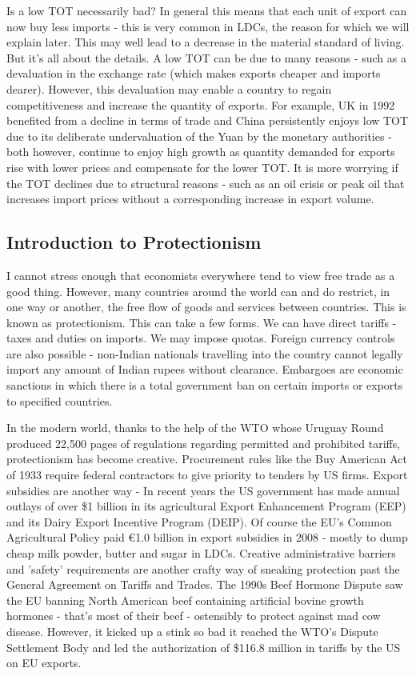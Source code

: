 Is a low TOT necessarily bad? In general this means that each unit of export can now buy less imports - this is very common in LDCs, the reason for which we will explain later. This may well lead to a decrease in the material standard of living. But it's all about the details. A low TOT can be due to many reasons - such as a devaluation in the exchange rate (which makes exports cheaper and imports dearer). However, this devaluation may enable a country to regain competitiveness and increase the quantity of exports. For example, UK in 1992 benefited from a decline in terms of trade and China persistently enjoys low TOT due to its deliberate undervaluation of the Yuan by the monetary authorities - both however, continue to enjoy high growth as quantity demanded for exports rise with lower prices and compensate for the lower TOT. It is more worrying if the TOT declines due to structural reasons - such as an oil crisis or peak oil that increases import prices without a corresponding increase in export volume.
\subsection{Introduction to Protectionism}
I cannot stress enough that economists everywhere tend to view free trade as a good thing. However, many countries around the world can and do restrict, in one way or another, the free flow of goods and services between countries. This is known as protectionism. This can take a few forms. We can have direct tariffs - taxes and duties on imports. We may impose quotas. Foreign currency controls are also possible - non-Indian nationals travelling into the country cannot legally import any amount of Indian rupees without clearance. Embargoes are economic sanctions in which there is a total government ban on certain imports or exports to specified countries.

In the modern world, thanks to the help of the WTO whose Uruguay Round produced 22,500 pages of regulations regarding permitted and prohibited tariffs, protectionism has become creative. Procurement rules like the Buy American Act of 1933 require federal contractors to give priority to tenders by US firms. Export subsidies are another way - In recent years the US government has made annual outlays of over \$1 billion in its agricultural Export Enhancement Program (EEP) and its Dairy Export Incentive Program (DEIP). Of course the EU's Common Agricultural Policy paid €1.0 billion in export subsidies in 2008 - mostly to dump cheap milk powder, butter and sugar in LDCs. Creative administrative barriers and 'safety' requirements are another crafty way of sneaking protection past the General Agreement on Tariffs and Trades. The 1990s Beef Hormone Dispute saw the EU banning North American beef containing artificial bovine growth hormones - that's most of their beef - ostensibly to protect against mad cow disease. However, it kicked up a stink so bad it reached the WTO's Dispute Settlement Body and led the authorization of \$116.8 million in tariffs by the US on EU exports.

